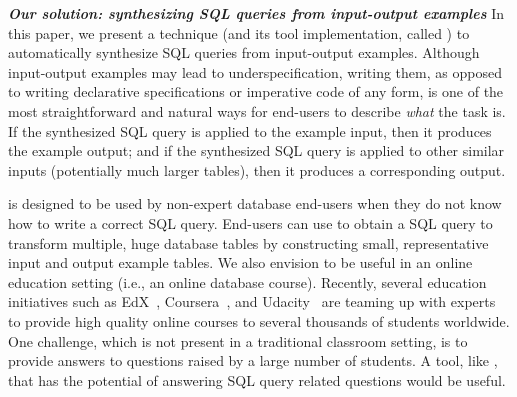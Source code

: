 

\vspace{1mm}
\noindent \textbf{\textit{Our solution: synthesizing SQL queries from input-output examples}}
In this paper, we present a technique (and its tool
implementation, called \ourtool) to automatically synthesize SQL queries
from input-output examples.
Although input-output examples may lead to
underspecification, writing them, as opposed to writing
declarative specifications or imperative code
of any form, is one of the most straightforward and natural ways
for end-users to describe \textit{what} the task is.
If the synthesized SQL query is applied
to the example input, then it produces the example output; and if the
synthesized SQL query is applied to other
similar inputs (potentially much larger tables),
then it produces a corresponding output.




\ourtool is designed to be used by non-expert database
end-users when they do not know how
to write a correct SQL query. 
End-users can use \ourtool to obtain a SQL query to transform
multiple, huge database tables by constructing small, representative
input and output example tables. 
We also envision \ourtool to be useful in an online education
setting (i.e., an online database course). Recently, several
education initiatives such as EdX~\cite{edx}, Coursera~\cite{coursera},
and Udacity~\cite{udacity} are teaming up with experts to provide
high quality online courses
to several thousands of students worldwide.
One challenge, which is not present in a traditional classroom
setting, is to provide answers to questions raised by a large
number of students. A tool, like \ourtool,
that has the potential of answering SQL query related questions
would be useful.


